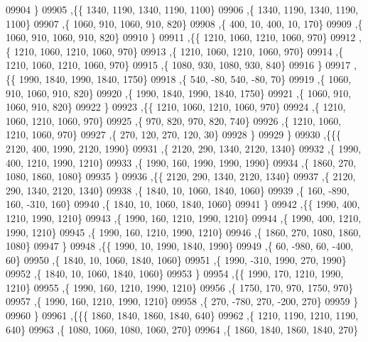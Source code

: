 \begin{DoxyCode}
09904     \}
09905    ,\{\{  1340,  1190,  1340,  1190,  1100\}
09906     ,\{  1340,  1190,  1340,  1190,  1100\}
09907     ,\{  1060,   910,  1060,   910,   820\}
09908     ,\{   400,    10,   400,    10,   170\}
09909     ,\{  1060,   910,  1060,   910,   820\}
09910     \}
09911    ,\{\{  1210,  1060,  1210,  1060,   970\}
09912     ,\{  1210,  1060,  1210,  1060,   970\}
09913     ,\{  1210,  1060,  1210,  1060,   970\}
09914     ,\{  1210,  1060,  1210,  1060,   970\}
09915     ,\{  1080,   930,  1080,   930,   840\}
09916     \}
09917    ,\{\{  1990,  1840,  1990,  1840,  1750\}
09918     ,\{   540,   -80,   540,   -80,    70\}
09919     ,\{  1060,   910,  1060,   910,   820\}
09920     ,\{  1990,  1840,  1990,  1840,  1750\}
09921     ,\{  1060,   910,  1060,   910,   820\}
09922     \}
09923    ,\{\{  1210,  1060,  1210,  1060,   970\}
09924     ,\{  1210,  1060,  1210,  1060,   970\}
09925     ,\{   970,   820,   970,   820,   740\}
09926     ,\{  1210,  1060,  1210,  1060,   970\}
09927     ,\{   270,   120,   270,   120,    30\}
09928     \}
09929    \}
09930   ,\{\{\{  2120,   400,  1990,  2120,  1990\}
09931     ,\{  2120,   290,  1340,  2120,  1340\}
09932     ,\{  1990,   400,  1210,  1990,  1210\}
09933     ,\{  1990,   160,  1990,  1990,  1990\}
09934     ,\{  1860,   270,  1080,  1860,  1080\}
09935     \}
09936    ,\{\{  2120,   290,  1340,  2120,  1340\}
09937     ,\{  2120,   290,  1340,  2120,  1340\}
09938     ,\{  1840,    10,  1060,  1840,  1060\}
09939     ,\{   160,  -890,   160,  -310,   160\}
09940     ,\{  1840,    10,  1060,  1840,  1060\}
09941     \}
09942    ,\{\{  1990,   400,  1210,  1990,  1210\}
09943     ,\{  1990,   160,  1210,  1990,  1210\}
09944     ,\{  1990,   400,  1210,  1990,  1210\}
09945     ,\{  1990,   160,  1210,  1990,  1210\}
09946     ,\{  1860,   270,  1080,  1860,  1080\}
09947     \}
09948    ,\{\{  1990,    10,  1990,  1840,  1990\}
09949     ,\{    60,  -980,    60,  -400,    60\}
09950     ,\{  1840,    10,  1060,  1840,  1060\}
09951     ,\{  1990,  -310,  1990,   270,  1990\}
09952     ,\{  1840,    10,  1060,  1840,  1060\}
09953     \}
09954    ,\{\{  1990,   170,  1210,  1990,  1210\}
09955     ,\{  1990,   160,  1210,  1990,  1210\}
09956     ,\{  1750,   170,   970,  1750,   970\}
09957     ,\{  1990,   160,  1210,  1990,  1210\}
09958     ,\{   270,  -780,   270,  -200,   270\}
09959     \}
09960    \}
09961   ,\{\{\{  1860,  1840,  1860,  1840,   640\}
09962     ,\{  1210,  1190,  1210,  1190,   640\}
09963     ,\{  1080,  1060,  1080,  1060,   270\}
09964     ,\{  1860,  1840,  1860,  1840,   270\}

\end{DoxyCode}
